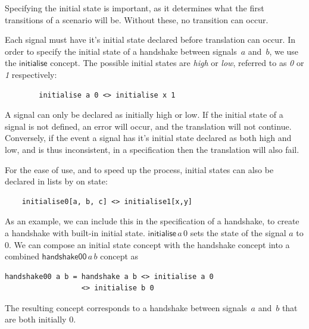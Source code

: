 \documentclass[british,conference,compsoc]{IEEEtran}
\begin{document}
Specifying the initial state is important, as it determines what the first 
transitions of a scenario will be. Without these, no transition can occur.

Each signal must have it's initial state declared before translation can occur. 
In order to specify the initial state of a handshake between signals~$a$
and~$b$, we use the $\mathsf{initialise}$ concept.
The possible initial states are \emph{high} or \emph{low}, referred to as 
\emph{0} or \emph{1} respectively:

\begin{lstlisting}
        initialise a 0 <> initialise x 1
\end{lstlisting}

\noindent A signal can only be declared as initially high or low. If the 
initial state of a signal is not defined, an error will occur, and the 
translation will not continue. Conversely, if the event a signal has it's 
initial state declared as both high and low, and is thus inconsistent, in a 
specification then the translation will also fail.

For the ease of use, and to speed up the process, initial states can also be 
declared in lists by on state:

\begin{lstlisting}
    initialise0[a, b, c] <> initialise1[x,y]
\end{lstlisting}

\noindent As an example, we can include this in the specification of a 
handshake, to create a handshake with built-in initial state.
$\mathsf{initialise}\,a\, 0$ sets the state of the signal
$a$ to $0$. We can compose an initial state concept with the handshake concept
into a combined $\mathsf{handshake00}\,a\, b$ concept as

\begin{lstlisting}
handshake00 a b = handshake a b <> initialise a 0 
                  <> initialise b 0
\end{lstlisting}

The resulting concept corresponds to a handshake between signals~$a$
and~$b$ that are both initially $0$.

\vspace{-2mm}
\end{document}
